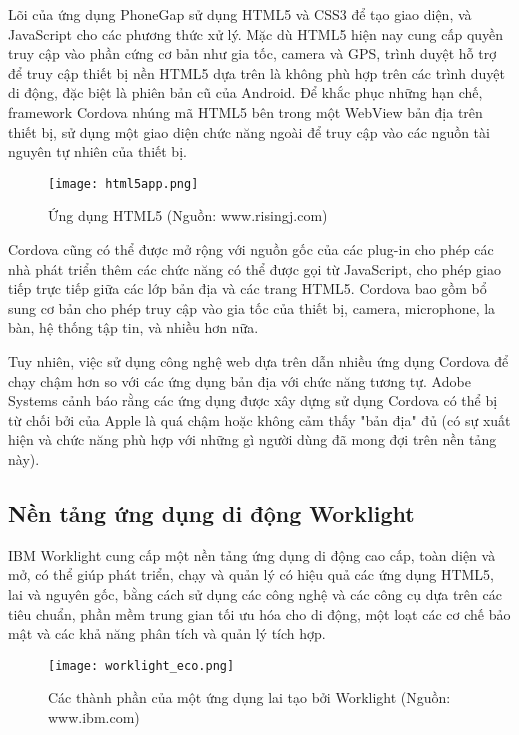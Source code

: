 Lõi của ứng dụng PhoneGap sử dụng HTML5 và CSS3 để tạo giao diện, và JavaScript cho các phương thức xử lý. Mặc dù HTML5 hiện nay cung cấp quyền truy cập vào phần cứng cơ bản như gia tốc, camera và GPS, trình duyệt hỗ trợ để truy cập thiết bị nền HTML5 dựa trên là không phù hợp trên các trình duyệt di động, đặc biệt là phiên bản cũ của Android. Để khắc phục những hạn chế, framework Cordova nhúng mã HTML5 bên trong một WebView bản địa trên thiết bị, sử dụng một giao diện chức năng ngoài để truy cập vào các nguồn tài nguyên tự nhiên của thiết bị.

\begin{figure}[!htb] 
\centering
\texttt{[image: html5app.png]}
\caption{Ứng dụng HTML5 (Nguồn: www.risingj.com)}
\end{figure}

Cordova cũng có thể được mở rộng với nguồn gốc của các plug-in cho phép các nhà phát triển thêm các chức năng có thể được gọi từ JavaScript, cho phép giao tiếp trực tiếp giữa các lớp bản địa và các trang HTML5. Cordova bao gồm bổ sung cơ bản cho phép truy cập vào gia tốc của thiết bị, camera, microphone, la bàn, hệ thống tập tin, và nhiều hơn nữa.

Tuy nhiên, việc sử dụng công nghệ web dựa trên dẫn nhiều ứng dụng Cordova để chạy chậm hơn so với các ứng dụng bản địa với chức năng tương tự. Adobe Systems cảnh báo rằng các ứng dụng được xây dựng sử dụng Cordova có thể bị từ chối bởi của Apple là quá chậm hoặc không cảm thấy "bản địa" đủ (có sự xuất hiện và chức năng phù hợp với những gì người dùng đã mong đợi trên nền tảng này).

\subsection{Nền tảng ứng dụng di động Worklight}

IBM Worklight cung cấp một nền tảng ứng dụng di động cao cấp, toàn diện và mở, có thể giúp phát triển, chạy và quản lý có hiệu quả các ứng dụng HTML5, lai và nguyên gốc, bằng cách sử dụng các công nghệ và các công cụ dựa trên các tiêu chuẩn, phần mềm trung gian tối ưu hóa cho di động, một loạt các cơ chế bảo mật và các khả năng phân tích và quản lý tích hợp.

\begin{figure}[!htb] 
\centering
\texttt{[image: worklight\_eco.png]}
\caption{Các thành phần của một ứng dụng lai tạo bởi Worklight (Nguồn: www.ibm.com)}
\end{figure}

